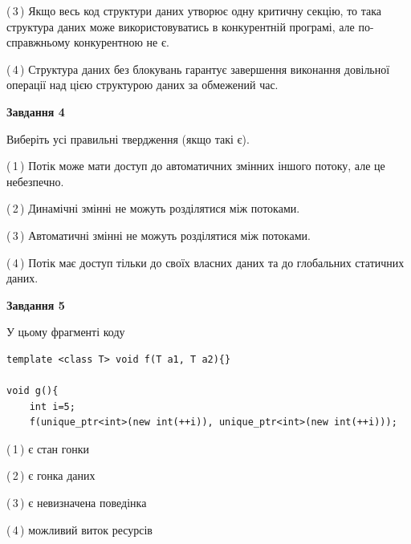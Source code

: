 \documentclass[12pt, ukrainian]{article}
\begin{document}
\begin {large}
{(\,3\,) Якщо весь код структури даних утворює одну критичну секцію, то така структура даних може використовуватись в конкурентній програмі, але по-справжньо\-му конкурентною не є.%

(\,4\,) Структура даних без блокувань гарантує завершення виконання довільної операції над цією структурою даних за обмежений час.%



\begin{center}
\textbf{Завдання 4}
\end{center}
Виберіть усі правильні твердження (якщо такі є).\par
\vspace{2mm}

(\,1\,) Потік може мати доступ до автоматичних змінних іншого потоку, але це небезпечно.%

(\,2\,) Динамічні змінні не можуть розділятися між потоками.%

(\,3\,) Автоматичні змінні не можуть розділятися між потоками.%

(\,4\,) Потік має доступ тільки до своїх власних даних та до глобальних статичних даних.%



\begin{center}
\textbf{Завдання 5}
\end{center}
У цьому фрагменті коду
\begin{verbatim}
template <class T> void f(T a1, T a2){}

void g(){
    int i=5;
    f(unique_ptr<int>(new int(++i)), unique_ptr<int>(new int(++i)));
\end{verbatim}

(\,1\,) є стан гонки%

(\,2\,) є гонка даних%

(\,3\,) є невизначена поведінка%

(\,4\,) можливий виток ресурсів%


}
\end {large}
\end{document}
